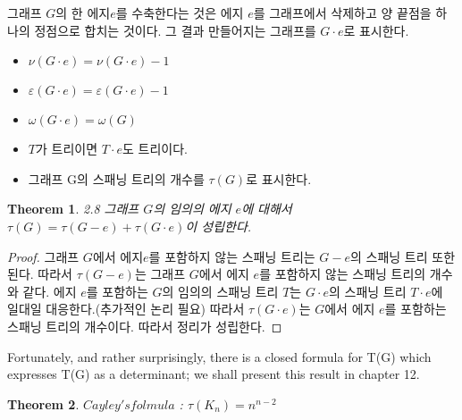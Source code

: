 \documentclass{oblivoir}
\newtheorem{theorem}{Theorem}[section]
\begin{document}
\begin{itemize}
    \begin{dfn}[contract]
        그래프 $G$의 한 에지$e$를 수축한다는 것은 에지 $e$를 그래프에서 삭제하고 양 끝점을 하나의 정점으로 합치는 것이다. 그 결과 만들어지는 그래프를 $G \cdot e$로 표시한다.
        \begin{itemize}
            \item $\nu(G \cdot e) = \nu(G \cdot e) - 1$
            \item $\varepsilon(G \cdot e) = \varepsilon(G \cdot e)-1$
            \item $\omega(G \cdot e) = \omega(G)$
            \item  $T$가 트리이면 $T \cdot e$도 트리이다.
            \item 그래프 G의 스패닝 트리의 개수를 $\tau(G)$로 표시한다.
        \end{itemize}
    \end{dfn}

    \begin{theorem}
        2.8 그래프 $G$의 임의의 에지 $e$에 대해서 $\tau(G) =\tau(G-e) + \tau(G \cdot e)$이 성립한다.
    \end{theorem}

    \begin{proof}
        그래프 $G$에서 에지$e$를 포함하지 않는 스패닝 트리는 $G-e$의 스패닝 트리 또한 된다.
        따라서 $\tau(G-e)$는 그래프 $G$에서 에지 $e$를 포함하지 않는 스패닝 트리의 개수와 같다.
        에지 $e$를 포함하는 $G$의 임의의 스패닝 트리 $T$는 $G \cdot e$의 스패닝 트리 $T \cdot e$에 일대일 대응한다.(추가적인 논리 필요) 따라서 $\tau(G \cdot e)$는 $G$에서 에지 $e$를 포함하는 스패닝 트리의 개수이다. 따라서 정리가 성립한다.
    \end{proof}
    

    Fortunately, and rather surprisingly, there is a closed formula for T(G) which expresses T(G) as a determinant; 
    we shall present this result in chapter 12.


    \begin{theorem}
        $Cayley's folmula$ : $\tau(K_n)= n^{n-2}$
    \end{theorem}


\end{itemize}
\end{document}
